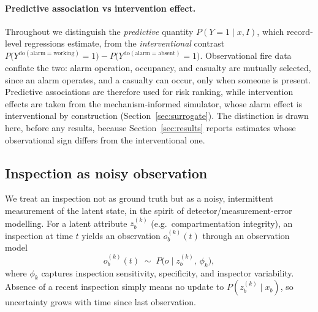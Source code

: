 \paragraph{Predictive association vs intervention effect.} Throughout we
distinguish the \emph{predictive} quantity $P(Y{=}1 \mid x, I)$, which record-level
regressions estimate, from the \emph{interventional} contrast
$P\!\big(Y^{\mathrm{do(alarm=working)}}{=}1\big) -
 P\!\big(Y^{\mathrm{do(alarm=absent)}}{=}1\big)$. Observational fire data conflate
the two: alarm operation, occupancy, and casualty are mutually selected, since an
alarm operates, and a casualty can occur, only when someone is present. Predictive
associations are therefore used for risk ranking, while intervention effects are
taken from the mechanism-informed simulator, whose alarm effect is interventional
by construction (Section~\ref{sec:surrogate}). The distinction is drawn here,
before any results, because Section~\ref{sec:results} reports estimates whose
observational sign differs from the interventional one.

\subsection{Inspection as noisy observation}
\label{sec:model-inspection}

We treat an inspection not as ground truth but as a noisy, intermittent
measurement of the latent state, in the spirit of detector/measurement-error
modelling. For a latent attribute $z_b^{(k)}$ (e.g.\ compartmentation integrity),
an inspection at time $t$ yields an observation $o_b^{(k)}(t)$ through an
observation model
\begin{equation}
  o_b^{(k)}(t) \;\sim\; P\!\big(o \mid z_b^{(k)},\, \phi_k \big),
  \label{eq:obs-model}
\end{equation}
where $\phi_k$ captures inspection sensitivity, specificity, and inspector
variability. Absence of a recent inspection simply means no update to
$P(z_b^{(k)}\mid x_b)$, so uncertainty grows with time since last observation.

